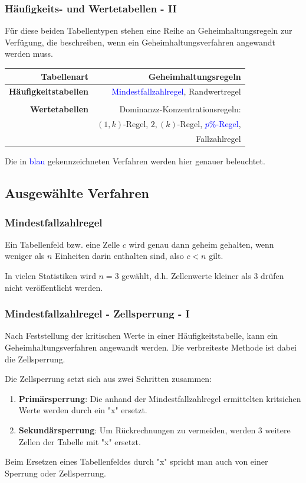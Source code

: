 \documentclass[aspectratio=169]{beamer}
\begin{document}
\begin{frame}
    \frametitle{Häufigkeits- und Wertetabellen - II}
    Für diese beiden Tabellentypen stehen eine Reihe an Geheimhaltungsregeln zur Verfügung, die beschreiben, wenn ein Geheimhaltungsverfahren angewandt werden muss.
    \begin{center}
        \begin{tabular}{ r r }
         \textbf{Tabellenart} \vline & \textbf{Geheimhaltungsregeln} \\ 
         \hline
         \textbf{Häufigkeitstabellen} \vline & \textcolor{blue}{Mindestfallzahlregel}, Randwertregel \\  
         \vline & \\
         \hline
         \textbf{Wertetabellen} \vline & Dominanzz-Konzentrationsregeln:  \\
         \vline & $(1,k)$-Regel, $2,(k)$-Regel, \textcolor{blue}{$p$\%-Regel}, \\
         \vline & Fallzahlregel
        \end{tabular}
    \end{center}
    Die in \textcolor{blue}{blau} gekennzeichneten Verfahren werden hier genauer beleuchtet.
\end{frame}


\subsection{Ausgewählte Verfahren}

\begin{frame}
    \frametitle{Mindestfallzahlregel}
    \begin{theorem}[Mindestfallzahlregel]
        Ein Tabellenfeld bzw. eine Zelle $c$ wird genau dann geheim gehalten, wenn weniger als $n$ Einheiten darin enthalten sind, also $c < n$ gilt.
    \end{theorem}
    In vielen Statistiken wird $n = 3$ gewählt, d.h. Zellenwerte kleiner als $3$ drüfen nicht veröffentlicht werden.
\end{frame}


\begin{frame}
    \frametitle{Mindestfallzahlregel - Zellsperrung - I}
    Nach Feststellung der kritischen Werte in einer Häufigkeitstabelle, kann ein Geheimhaltungsverfahren angewandt werden. Die verbreiteste Methode ist dabei die Zellsperrung.
    \begin{theorem}[Zellsperrung]
        Die Zellsperrung setzt sich aus zwei Schritten zusammen:
        \begin{enumerate}
            \item \textbf{Primärsperrung}: Die anhand der Mindestfallzahlregel ermittelten kritsichen Werte werden durch ein "x" ersetzt.
            \item \textbf{Sekundärsperrung}: Um Rückrechnungen zu vermeiden, werden 3 weitere Zellen der Tabelle mit "x" ersetzt.
        \end{enumerate}
    \end{theorem}
    Beim Ersetzen eines Tabellenfeldes durch "x" spricht man auch von einer Sperrung oder Zellsperrung.
\end{frame}
\end{document}
